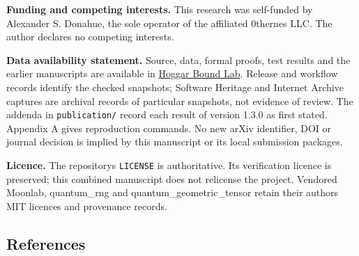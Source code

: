 \documentclass[11pt,a4paper]{article}
\begin{document}
\textbf{Funding and competing interests.} This research was self-funded by Alexander S. Donahue, the sole
operator of the affiliated 0thernes LLC. The author declares no competing interests.

\textbf{Data availability statement.} Source, data, formal proofs, test results and the earlier manuscripts
are available in \href{https://github.com/0thernes/hoggar-bound-lab}{Hoggar Bound Lab}. Release and workflow
records identify the checked snapshots; Software Heritage and Internet Archive captures are archival
records of particular snapshots, not evidence of review. The addenda in \texttt{publication/} record each
result of version 1.3.0 as first stated.
Appendix A gives reproduction commands. No new arXiv identifier, DOI or journal decision is implied
by this manuscript or its local submission packages.

\textbf{Licence.} The repository\textquotesingle s \texttt{LICENSE} is authoritative. Its verification licence is preserved;
this combined manuscript does not relicense the project. Vendored Moonlab, quantum\_rng and
quantum\_geometric\_tensor retain their authors\textquotesingle{} MIT licences and provenance records.

\subsection{References}\label{references}
\end{document}
